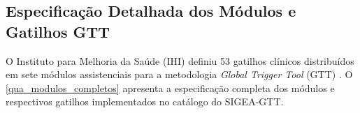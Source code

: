 \begin{apendicesenv}

\partapendices

\chapter{Especificação Detalhada dos Módulos e Gatilhos GTT}
\label{apend_modulos_gatilhos}

O Instituto para Melhoria da Saúde (IHI) definiu 53 gatilhos clínicos
distribuídos em sete módulos assistenciais para a metodologia
\textit{Global Trigger Tool} (GTT) \cite{griffin2009ihi}. O
\autoref{qua_modulos_completos} apresenta a especificação completa
dos módulos e respectivos gatilhos implementados no catálogo do SIGEA-GTT.


\end{apendicesenv}

